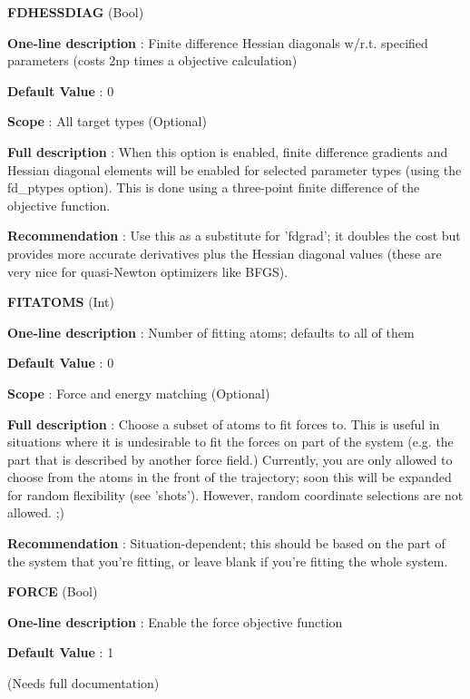 \begin{DoxyItemize}
\item {\bfseries  \-F\-D\-H\-E\-S\-S\-D\-I\-A\-G } (\-Bool) \par
{\bfseries  \-One-\/line description }\-: \-Finite difference \-Hessian diagonals w/r.\-t. specified parameters (costs 2np times a objective calculation) \par
{\bfseries  \-Default \-Value }\-: 0 \par
{\bfseries  \-Scope }\-: \-All target types (\-Optional) \par
{\bfseries  \-Full description }\-: \-When this option is enabled, finite difference gradients and \-Hessian diagonal elements will be enabled for selected parameter types (using the fd\-\_\-ptypes option). \-This is done using a three-\/point finite difference of the objective function. \par
{\bfseries  \-Recommendation }\-: \-Use this as a substitute for 'fdgrad'; it doubles the cost but provides more accurate derivatives plus the \-Hessian diagonal values (these are very nice for quasi-\/\-Newton optimizers like \-B\-F\-G\-S).\end{DoxyItemize}
\begin{DoxyItemize}
\item {\bfseries  \-F\-I\-T\-A\-T\-O\-M\-S } (\-Int) \par
{\bfseries  \-One-\/line description }\-: \-Number of fitting atoms; defaults to all of them \par
{\bfseries  \-Default \-Value }\-: 0 \par
{\bfseries  \-Scope }\-: \-Force and energy matching (\-Optional) \par
{\bfseries  \-Full description }\-: \-Choose a subset of atoms to fit forces to. \-This is useful in situations where it is undesirable to fit the forces on part of the system (e.\-g. the part that is described by another force field.) \-Currently, you are only allowed to choose from the atoms in the front of the trajectory; soon this will be expanded for random flexibility (see 'shots'). \-However, random coordinate selections are not allowed. ;) \par
{\bfseries  \-Recommendation }\-: \-Situation-\/dependent; this should be based on the part of the system that you're fitting, or leave blank if you're fitting the whole system.\end{DoxyItemize}
\begin{DoxyItemize}
\item {\bfseries  \-F\-O\-R\-C\-E } (\-Bool) \par
{\bfseries  \-One-\/line description }\-: \-Enable the force objective function \par
{\bfseries  \-Default \-Value }\-: 1 \par
(\-Needs full documentation)\end{DoxyItemize}
